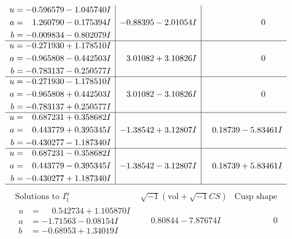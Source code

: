 \documentclass[1p]{elsarticle_modified}
\theoremstyle{definition}
\newcommand{\I}{\sqrt{-1}}
\begin{document}
$$\begin{array}{c|c|c}
\begin{aligned}
u &= -0.596579 - 1.045740 I \\
a &= \phantom{-}1.260790 - 0.175394 I \\
b &= -0.009834 - 0.802079 I\end{aligned}
 & -0.88395 - 2.01054 I & \phantom{-0.000000 } 0 \\ \hline\begin{aligned}
u &= -0.271930 + 1.178510 I \\
a &= -0.965808 - 0.442503 I \\
b &= -0.783137 - 0.250577 I\end{aligned}
 & \phantom{-}3.01082 + 3.10826 I & \phantom{-0.000000 } 0 \\ \hline\begin{aligned}
u &= -0.271930 - 1.178510 I \\
a &= -0.965808 + 0.442503 I \\
b &= -0.783137 + 0.250577 I\end{aligned}
 & \phantom{-}3.01082 - 3.10826 I & \phantom{-0.000000 } 0 \\ \hline\begin{aligned}
u &= \phantom{-}0.687231 + 0.358682 I \\
a &= \phantom{-}0.443779 + 0.395345 I \\
b &= -0.430277 - 1.187340 I\end{aligned}
 & -1.38542 + 3.12807 I & \phantom{-}0.18739 - 5.83461 I \\ \hline\begin{aligned}
u &= \phantom{-}0.687231 - 0.358682 I \\
a &= \phantom{-}0.443779 - 0.395345 I \\
b &= -0.430277 + 1.187340 I\end{aligned}
 & -1.38542 - 3.12807 I & \phantom{-}0.18739 + 5.83461 I\\
 \hline 
 \end{array}$$\newpage$$\begin{array}{c|c|c}  
\text{Solutions to }I^u_{1}& \I (\text{vol} + \sqrt{-1}CS) & \text{Cusp shape}\\
 \hline 
\begin{aligned}
u &= \phantom{-}0.542734 + 1.105870 I \\
a &= -1.71563 - 0.08154 I \\
b &= -0.68953 + 1.34019 I\end{aligned}
 & \phantom{-}0.80844 - 7.87674 I & \phantom{-0.000000 } 0 \\ \hline\begin{aligned}

\end{aligned}
\end{array}$$
\end{document}
